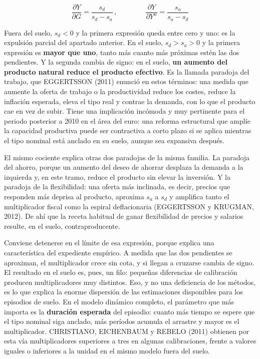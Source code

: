 \documentclass[10pt,a4paper]{article}
\begin{document}
$$\frac{\partial Y}{\partial G}=\frac{s_{d}}{s_{d}-s_{a}}\,,\qquad\qquad\frac{\partial Y}{\partial Y^{n}}=\frac{s_{a}}{s_{a}-s_{d}}$$

Fuera del suelo, $s_{d}<0$ y la primera expresión queda entre cero y uno: es la expulsión parcial del apartado anterior. En el suelo, $s_{d}>s_{a}>0$ y la primera expresión es \textbf{mayor que uno}, tanto más cuanto más próximas estén las dos pendientes. Y la segunda cambia de signo: en el suelo, \textbf{un aumento del producto natural reduce el producto efectivo}. Es la llamada paradoja del trabajo, que EGGERTSSON (2011) enunció en estos términos: una medida que aumente la oferta de trabajo o la productividad reduce los costes, reduce la inflación esperada, eleva el tipo real y contrae la demanda, con lo que el producto cae en vez de subir. Tiene una implicación incómoda y muy pertinente para el periodo posterior a 2010 en el área del euro: una reforma estructural que amplíe la capacidad productiva puede ser contractiva a corto plazo si se aplica mientras el tipo nominal está anclado en su suelo, aunque sea expansiva después.

El mismo cociente explica otras dos paradojas de la misma familia. La paradoja del ahorro, porque un aumento del deseo de ahorrar desplaza la demanda a la izquierda y, en este tramo, reduce el producto sin elevar la inversión. Y la paradoja de la flexibilidad: una oferta más inclinada, es decir, precios que responden más deprisa al producto, aproxima $s_{a}$ a $s_{d}$ y amplifica tanto el multiplicador fiscal como la espiral deflacionaria (EGGERTSSON y KRUGMAN, 2012). De ahí que la receta habitual de ganar flexibilidad de precios y salarios resulte, en el suelo, contraproducente.

Conviene detenerse en el límite de esa expresión, porque explica una característica del expediente empírico. A medida que las dos pendientes se aproximan, el multiplicador crece sin cota, y si llegan a cruzarse cambia de signo. El resultado en el suelo es, pues, un filo: pequeñas diferencias de calibración producen multiplicadores muy distintos. Eso, y no una deficiencia de los métodos, es lo que explica la enorme dispersión de las estimaciones disponibles para los episodios de suelo. En el modelo dinámico completo, el parámetro que más importa es la \textbf{duración esperada} del episodio: cuanto más tiempo se espere que el tipo nominal siga anclado, más períodos acumula el arrastre y mayor es el multiplicador. CHRISTIANO, EICHENBAUM y REBELO (2011) obtienen por esta vía multiplicadores superiores a tres en algunas calibraciones, frente a valores iguales o inferiores a la unidad en el mismo modelo fuera del suelo.
\end{document}
